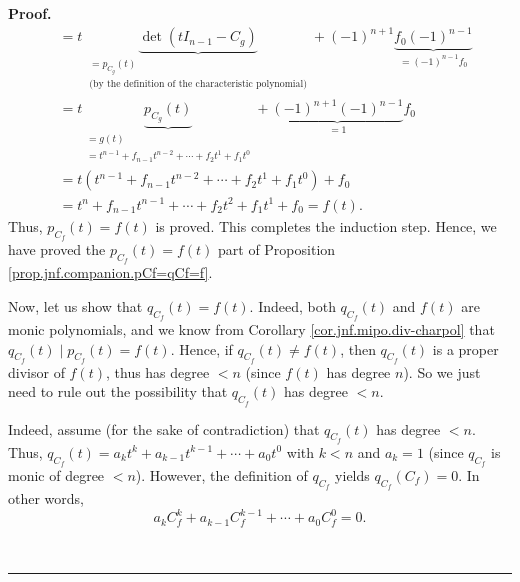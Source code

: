 \documentclass[numbers=enddot,12pt,final,onecolumn,notitlepage]{scrartcl}%
\numberwithin{exer}{subsection}
\theoremstyle{definition}
\newenvironment{proof}[1][Proof]{\noindent\textbf{#1.} }{\ \rule{0.5em}{0.5em}}
\begin{document}
\begin{proof}
\begin{align*}
&  =t\ \underbrace{\det\left(  tI_{n-1}-C_{g}\right)  }_{\substack{=p_{C_{g}%
}\left(  t\right)  \\\text{(by the definition of the characteristic
polynomial)}}}+\left(  -1\right)  ^{n+1}\underbrace{f_{0}\left(  -1\right)
^{n-1}}_{=\left(  -1\right)  ^{n-1}f_{0}}\\
&  =t\underbrace{p_{C_{g}}\left(  t\right)  }_{\substack{=g\left(  t\right)
\\=t^{n-1}+f_{n-1}t^{n-2}+\cdots+f_{2}t^{1}+f_{1}t^{0}}}+\underbrace{\left(
-1\right)  ^{n+1}\left(  -1\right)  ^{n-1}}_{=1}f_{0}\\
&  =t\left(  t^{n-1}+f_{n-1}t^{n-2}+\cdots+f_{2}t^{1}+f_{1}t^{0}\right)
+f_{0}\\
&  =t^{n}+f_{n-1}t^{n-1}+\cdots+f_{2}t^{2}+f_{1}t^{1}+f_{0}=f\left(  t\right)
.
\end{align*}
Thus, $p_{C_{f}}\left(  t\right)  =f\left(  t\right)  $ is proved. This
completes the induction step. Hence, we have proved the $p_{C_{f}}\left(
t\right)  =f\left(  t\right)  $ part of Proposition
\ref{prop.jnf.companion.pCf=qCf=f}.

Now, let us show that $q_{C_{f}}\left(  t\right)  =f\left(  t\right)  $.
Indeed, both $q_{C_{f}}\left(  t\right)  $ and $f\left(  t\right)  $ are monic
polynomials, and we know from Corollary \ref{cor.jnf.mipo.div-charpol} that
$q_{C_{f}}\left(  t\right)  \mid p_{C_{f}}\left(  t\right)  =f\left(
t\right)  $. Hence, if $q_{C_{f}}\left(  t\right)  \neq f\left(  t\right)  $,
then $q_{C_{f}}\left(  t\right)  $ is a proper divisor of $f\left(  t\right)
$, thus has degree $<n$ (since $f\left(  t\right)  $ has degree $n$). So we
just need to rule out the possibility that $q_{C_{f}}\left(  t\right)  $ has
degree $<n$.

Indeed, assume (for the sake of contradiction) that $q_{C_{f}}\left(
t\right)  $ has degree $<n$. Thus, $q_{C_{f}}\left(  t\right)  =a_{k}%
t^{k}+a_{k-1}t^{k-1}+\cdots+a_{0}t^{0}$ with $k<n$ and $a_{k}=1$ (since
$q_{C_{f}}$ is monic of degree $<n$). However, the definition of $q_{C_{f}}$
yields $q_{C_{f}}\left(  C_{f}\right)  =0$. In other words,%
\[
a_{k}C_{f}^{k}+a_{k-1}C_{f}^{k-1}+\cdots+a_{0}C_{f}^{0}=0.
\]



\end{proof}
\end{document}
